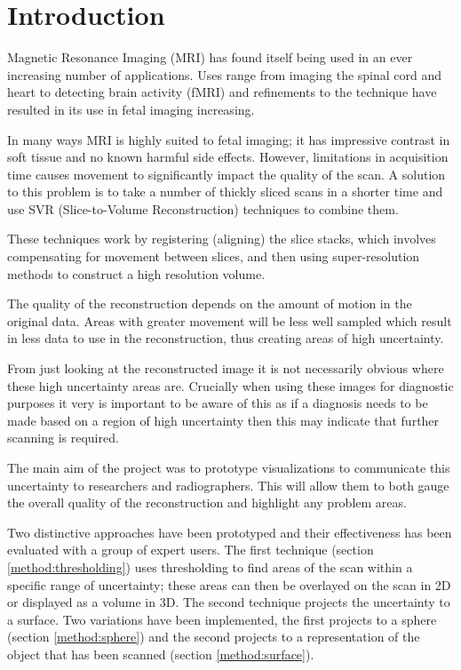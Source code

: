 \chapter{Introduction}\label{chapter:introduction}

Magnetic Resonance Imaging (MRI) has found itself being used in an ever increasing number of applications. Uses range from imaging the spinal cord and heart to detecting brain activity (fMRI) and refinements to the technique have resulted in its use in fetal imaging increasing.

In many ways MRI is highly suited to fetal imaging; it has impressive contrast in soft tissue and no known harmful side effects. However, limitations in acquisition time causes movement to significantly impact the quality of the scan. A solution to this problem is to take a number of thickly sliced scans in a shorter time and use SVR (Slice-to-Volume Reconstruction) techniques to combine them.

These techniques work by registering (aligning) the slice stacks, which involves compensating for movement between slices, and then using super-resolution methods to construct a high resolution volume.

The quality of the reconstruction depends on the amount of motion in the original data. Areas with greater movement will be less well sampled which result in less data to use in the reconstruction, thus creating areas of high uncertainty.

From just looking at the reconstructed image it is not necessarily obvious where these high uncertainty areas are. Crucially when using these images for diagnostic purposes it very is important to be aware of this as if a diagnosis needs to be made based on a region of high uncertainty then this may indicate that further scanning is required.

The main aim of the project was to prototype visualizations to communicate this uncertainty to researchers and radiographers. This will allow them to both gauge the overall quality of the reconstruction and highlight any problem areas.

Two distinctive approaches have been prototyped and their effectiveness has been evaluated with a group of expert users. The first technique (section \ref{method:thresholding}) uses thresholding to find areas of the scan within a specific range of uncertainty; these areas can then be overlayed on the scan in 2D or displayed as a volume in 3D. The second technique projects the uncertainty to a surface. Two variations have been implemented, the first projects to a sphere (section \ref{method:sphere}) and the second projects to a representation of the object that has been scanned (section \ref{method:surface}).

